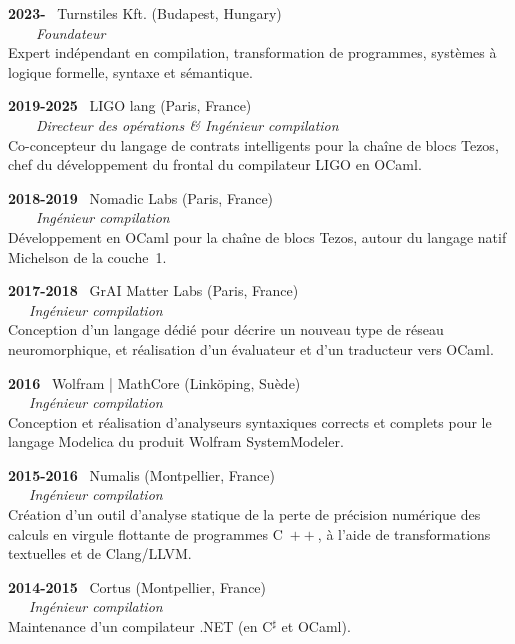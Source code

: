 \documentclass[a4paper,11pt]{article}
\newcommand{\cpp}{\mbox{C \hspace*{-2.5mm} \raise 0.7mm \hbox{${\scriptscriptstyle ++}$}}}
\begin{document}
\noindent\textbf{2023-} \ \textsf{Turnstiles Kft.} (Budapest,
Hungary)\\ \ \ \ \ \emph{Foundateur}\\
Expert indépendant en compilation, transformation de programmes,
systèmes à logique formelle, syntaxe et sémantique.

\bigskip

\noindent\textbf{2019-2025} \ \textsf{LIGO lang} (Paris,
France)\\ \ \ \ \ \emph{Directeur des opérations \& Ingénieur
compilation}\\ Co-concepteur du langage de contrats intelligents pour
la chaîne de blocs Tezos, chef du développement du frontal du
compilateur LIGO en OCaml.

\bigskip

\noindent\textbf{2018-2019} \ \textsf{Nomadic Labs} (Paris,
France)\\ \ \ \ \ \emph{Ingénieur compilation}\\ Développement en
OCaml pour la chaîne de blocs Tezos, autour du langage natif Michelson
de la couche~1.

\bigskip

\noindent\textbf{2017-2018} \ \textsf{GrAI Matter Labs} (Paris,
France)\\ \ \ \ \emph{Ingénieur compilation}\\ Conception d'un langage
dédié pour décrire un nouveau type de réseau neuromorphique, et
réalisation d'un évaluateur et d'un traducteur vers OCaml.

\newpage

\noindent\textbf{2016} \ \textsf{Wolfram | MathCore} (Link\"oping,
Suède)\\ \ \ \ \emph{Ingénieur compilation}\\ Conception et
réalisation d'analyseurs syntaxiques corrects et complets pour le
langage Modelica du produit Wolfram SystemModeler.

\bigskip

\noindent\textbf{2015-2016} \ \textsf{Numalis} (Montpellier,
France)\\ \ \ \ \emph{Ingénieur compilation}\\ Création d'un outil
d'analyse statique de la perte de précision numérique des calculs en
virgule flottante de programmes \cpp{}, à l'aide de
transformations textuelles et de Clang/LLVM.

\bigskip

\noindent\textbf{2014-2015} \ \textsf{Cortus} (Montpellier,
France)\\ \ \ \ \emph{Ingénieur compilation}\\ Maintenance d'un
compilateur .NET (en C$^\sharp$ et OCaml).
\end{document}
